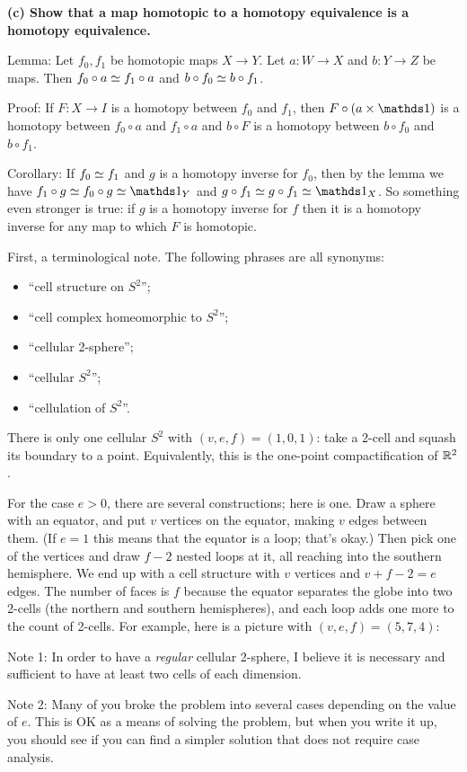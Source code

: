 {\bf (c) Show that a map homotopic to a homotopy equivalence is a homotopy equivalence.}

Lemma: Let $f_0,f_1$ be homotopic maps $X\to Y$.  Let $a:W\to X$ and $b:Y\to Z$ be maps.  Then $f_0\circ a\simeq f_1\circ a$
and $b\circ f_0\simeq b\circ f_1$.

Proof: If $F:X\to I$ is a homotopy between $f_0$ and $f_1$, then  $F\circ(a\x\IdMap)$ is a homotopy between $f_0\circ a$ and $f_1\circ a$ and $b\circ F$ is a homotopy between $b\circ f_0$ and $b\circ f_1$.

Corollary: If $f_0\simeq f_1$ and $g$ is a homotopy inverse for $f_0$, then by the lemma we have
$f_1\circ g\htop f_0\circ g\htop\IdMap_Y$ and $g\circ f_1\htop g\circ f_1\htop\IdMap_X$.  So something even stronger is true: if $g$ is a homotopy inverse for $f$ then it is a homotopy inverse for any map to which $F$ is homotopic.

\pagebreak

\soln First, a terminological note.  The following phrases are all synonyms:
\begin{itemize}
\item ``cell structure on $S^2$'';
\item ``cell complex homeomorphic to $S^2$'';
\item ``cellular 2-sphere'';
\item ``cellular $S^2$'';
\item ``cellulation of $S^2$''.
\end{itemize}

There is only one cellular $S^2$ with $(v,e,f)=(1,0,1)$: take a 2-cell and squash its boundary to a point.  Equivalently, this is the one-point compactification of $\mathbb{R}^2$.

For the case $e>0$, there are several constructions; here is one.  Draw a sphere with an equator, and put $v$ vertices on the equator, making $v$ edges between them.  (If $e=1$ this means that the equator is a loop; that's okay.)
Then pick one of the vertices and draw $f-2$ nested loops at it, all reaching into the southern hemisphere.  We end up with a cell structure with $v$ vertices and $v+f-2=e$ edges.  The number of faces is $f$ because the equator separates the globe into two 2-cells (the northern and southern hemispheres), and each loop adds one more to the count of 2-cells.  For example, here is a picture with $(v,e,f)=(5,7,4)$:


Note 1:  In order to have a \emph{regular} cellular 2-sphere, I believe it is necessary and sufficient to have at least two cells of each dimension.

Note 2: Many of you broke the problem into several cases depending on the value of $e$.  This is OK as a means of solving the problem, but when you write it up, you should see if you can find a simpler solution that does not require case analysis.


